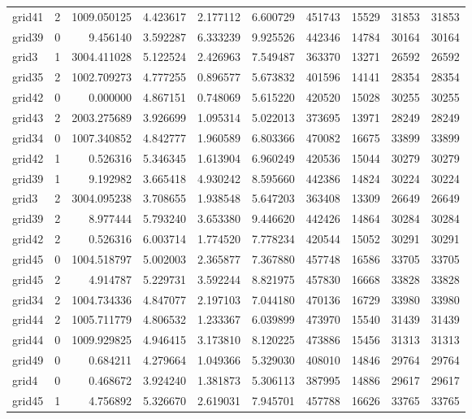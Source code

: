 \begin{longtable}{|l|r|r|r|r|r|r|r|r|r|}
grid41 & 2 & 1009.050125 & 4.423617 & 2.177112 & 6.600729 & 451743 & 15529 & 31853 & 31853 \\
grid39 & 0 & 9.456140 & 3.592287 & 6.333239 & 9.925526 & 442346 & 14784 & 30164 & 30164 \\
grid3 & 1 & 3004.411028 & 5.122524 & 2.426963 & 7.549487 & 363370 & 13271 & 26592 & 26592 \\
grid35 & 2 & 1002.709273 & 4.777255 & 0.896577 & 5.673832 & 401596 & 14141 & 28354 & 28354 \\
grid42 & 0 & 0.000000 & 4.867151 & 0.748069 & 5.615220 & 420520 & 15028 & 30255 & 30255 \\
grid43 & 2 & 2003.275689 & 3.926699 & 1.095314 & 5.022013 & 373695 & 13971 & 28249 & 28249 \\
grid34 & 0 & 1007.340852 & 4.842777 & 1.960589 & 6.803366 & 470082 & 16675 & 33899 & 33899 \\
grid42 & 1 & 0.526316 & 5.346345 & 1.613904 & 6.960249 & 420536 & 15044 & 30279 & 30279 \\
grid39 & 1 & 9.192982 & 3.665418 & 4.930242 & 8.595660 & 442386 & 14824 & 30224 & 30224 \\
grid3 & 2 & 3004.095238 & 3.708655 & 1.938548 & 5.647203 & 363408 & 13309 & 26649 & 26649 \\
grid39 & 2 & 8.977444 & 5.793240 & 3.653380 & 9.446620 & 442426 & 14864 & 30284 & 30284 \\
grid42 & 2 & 0.526316 & 6.003714 & 1.774520 & 7.778234 & 420544 & 15052 & 30291 & 30291 \\
grid45 & 0 & 1004.518797 & 5.002003 & 2.365877 & 7.367880 & 457748 & 16586 & 33705 & 33705 \\
grid45 & 2 & 4.914787 & 5.229731 & 3.592244 & 8.821975 & 457830 & 16668 & 33828 & 33828 \\
grid34 & 2 & 1004.734336 & 4.847077 & 2.197103 & 7.044180 & 470136 & 16729 & 33980 & 33980 \\
grid44 & 2 & 1005.711779 & 4.806532 & 1.233367 & 6.039899 & 473970 & 15540 & 31439 & 31439 \\
grid44 & 0 & 1009.929825 & 4.946415 & 3.173810 & 8.120225 & 473886 & 15456 & 31313 & 31313 \\
grid49 & 0 & 0.684211 & 4.279664 & 1.049366 & 5.329030 & 408010 & 14846 & 29764 & 29764 \\
grid4 & 0 & 0.468672 & 3.924240 & 1.381873 & 5.306113 & 387995 & 14886 & 29617 & 29617 \\
grid45 & 1 & 4.756892 & 5.326670 & 2.619031 & 7.945701 & 457788 & 16626 & 33765 & 33765 \\

\end{longtable}
